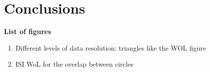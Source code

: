 \documentclass[11pt,oneside]{article}
\begin{document}

\section{Conclusions}



\printbibliography

\cleardoublepage

\textbf{List of figures}
\begin{enumerate}
	\item Different levels of data resolution: triangles like the WOL figure
	\item ISI WoL for the overlap between circles
\end{enumerate}
\end{document}
